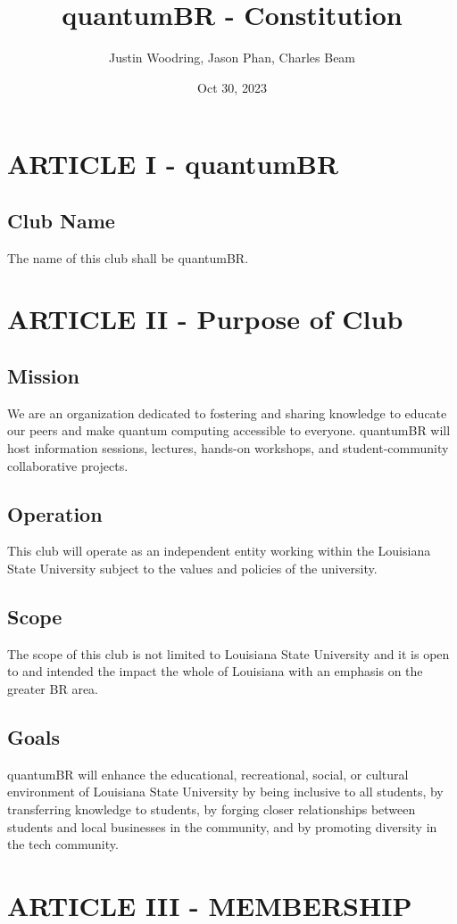 \documentclass[11pt]{amsart}
\title{quantumBR - Constitution}
\author{Justin Woodring, Jason Phan, Charles Beam}
\date{Oct 30, 2023}                                           %
\begin{document}
\maketitle

\section{ARTICLE I - quantumBR} 
\subsection{Club Name}
The name of this club shall be quantumBR.

\section{ARTICLE II - Purpose of Club}
\subsection{Mission}
We are an organization dedicated to fostering and sharing knowledge to educate our peers and make quantum computing accessible to everyone. quantumBR will host information sessions, lectures, hands-on workshops, and student-community collaborative projects.
\subsection{Operation}
This club will operate as an independent entity working within the Louisiana State University subject to the values and policies of the university.
\subsection{Scope}
The scope of this club is not limited to Louisiana State University and it is open to and intended the impact the whole of Louisiana with an emphasis on the greater BR area.
\subsection{Goals}
quantumBR will enhance the educational, recreational, social, or cultural environment of Louisiana State University by being inclusive to all students, by transferring knowledge to students, by forging closer relationships between students and local businesses in the community, and by promoting  diversity in the tech community.

\section{ARTICLE III - MEMBERSHIP}
\end{document}
